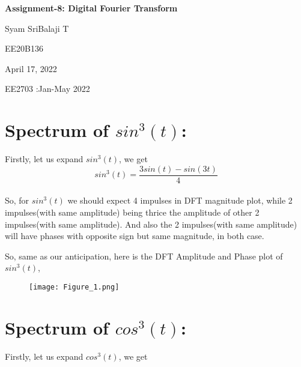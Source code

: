 \documentclass[12pt]{article}
\newcommand\titleofdoc{\LARGE{\textbf{Assignment-8: Digital Fourier Transform}}}
\begin{document}
\begin{titlepage}
   \begin{center}
        \vspace*{4cm} %

        \Huge{\titleofdoc} 

        \vspace{3 cm}
        \Large{Syam SriBalaji T}
       
        \vspace{0.25cm}
        \large{EE20B136}
       
        \vspace{3 cm}
        \Large{April 17, 2022}
        
        \vspace{0.25 cm}
        \Large{EE2703 :Jan-May 2022}
       

       \vfill
    \end{center}
\end{titlepage}

\setcounter{page}{2}
\pagestyle{fancy}
\fancyhf{}
\rhead{\thepage}

\section*{Spectrum of $sin^3(t)$:}

Firstly, let us expand $sin^3(t)$, we get
\begin{equation*}
sin^3(t)=\frac{3sin(t)-sin(3t)}{4}
\end{equation*}
\\
So, for $sin^3(t)$ we should expect 4 impulses in DFT magnitude plot, while 2 impulses(with same amplitude) being thrice the amplitude of other 2 impulses(with same amplitude). And also the 2 impulses(with same amplitude) will have phases with opposite sign but same magnitude, in both case.

So, same as our anticipation, here is the DFT Amplitude and Phase plot of $sin^3(t)$, 
\begin{figure}[h!]
\centering
\texttt{[image: Figure\_1.png]}
\end{figure}

\newpage
\section*{Spectrum of $cos^3(t)$:}

Firstly, let us expand $cos^3(t)$, we get
\end{document}
